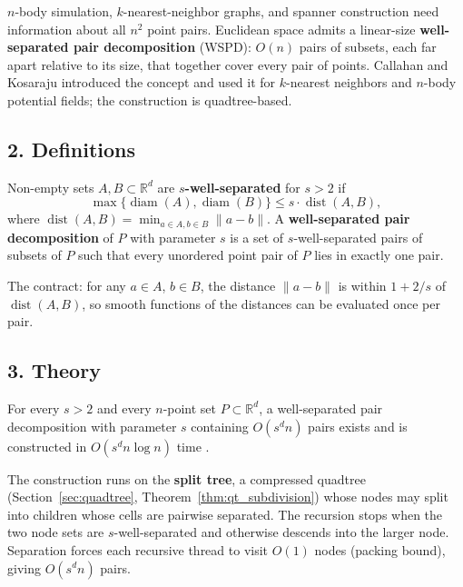 $n$-body simulation, $k$-nearest-neighbor graphs, and spanner construction
need information about all $n^2$ point pairs. Euclidean space admits a
linear-size \textbf{well-separated pair decomposition} (WSPD):
$O(n)$ pairs of subsets, each far apart relative to its size, that together
cover every pair of points. Callahan and Kosaraju introduced the concept
\cite{callahan1995} and used it for $k$-nearest neighbors and $n$-body
potential fields; the construction is quadtree-based.

\subsection{2. Definitions}

\begin{definition}\label{def:approx_ws_pair}
  Non-empty sets $A, B \subset \mathbb{R}^d$ are \textbf{$s$-well-separated}
  for $s > 2$ if
  \[
    \max\{\operatorname{diam}(A), \operatorname{diam}(B)\}
    \leq s \cdot \operatorname{dist}(A, B),
  \]
  where $\operatorname{dist}(A, B) = \min_{a \in A, b \in B}\|a - b\|$. A
  \textbf{well-separated pair decomposition} of $P$ with parameter $s$ is a
  set of $s$-well-separated pairs of subsets of $P$ such that every unordered
  point pair of $P$ lies in exactly one pair.
\end{definition}

The contract: for any $a \in A$, $b \in B$, the distance $\|a - b\|$ is
within $1 + 2/s$ of $\operatorname{dist}(A, B)$, so smooth functions of the
distances can be evaluated once per pair.

\subsection{3. Theory}

\begin{theorem}\label{thm:approx_wspd_size}
  For every $s > 2$ and every $n$-point set $P \subset \mathbb{R}^d$, a
  well-separated pair decomposition with parameter $s$ containing
  $O(s^d n)$ pairs exists and is constructed in $O(s^d n \log n)$ time
  \cite{callahan1995}.
\end{theorem}

The construction runs on the \textbf{split tree}, a compressed quadtree
(Section~\ref{sec:quadtree}, Theorem~\ref{thm:qt_subdivision}) whose nodes
may split into children whose cells are pairwise separated. The recursion
 stops when the two node sets are $s$-well-separated and
otherwise descends into the larger node. Separation forces each recursive
thread to visit $O(1)$ nodes (packing bound), giving $O(s^d n)$ pairs.

